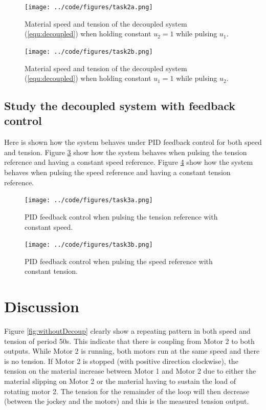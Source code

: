 \documentclass[a4paper, titlepage]{article}
\begin{document}
\begin{figure}[H]
\center
\texttt{[image: ../code/figures/task2a.png]}
\caption{Material speed and tension of the decoupled system (\ref{equ:decoupled}) when holding constant $u_2 = 1$ while pulsing $u_1$.}
\label{fig:withDecoupSpeedA}
\end{figure}

\begin{figure}[H]
\center
\texttt{[image: ../code/figures/task2b.png]}
\caption{Material speed and tension of the decoupled system (\ref{equ:decoupled}) when holding constant $u_1 = 1$ while pulsing $u_2$.}
\label{fig:withDecoupSpeedB}
\end{figure}


\subsection{Study the decoupled system with feedback control}
Here is shown how the system behaves under PID feedback control for both speed and tension.
Figure \ref{fig:withFeedbackDecoupSpeedA} show how the system behaves when pulsing the tension reference and having a constant speed reference.
Figure \ref{fig:withFeedbackDecoupSpeedB} show how the system behaves when pulsing the speed reference and having a constant tension reference.

\begin{figure}[H]
\center
\texttt{[image: ../code/figures/task3a.png]}
\caption{PID feedback control when pulsing the tension reference with constant speed.}
\label{fig:withFeedbackDecoupSpeedA}
\end{figure}

\begin{figure}[H]
\center
\texttt{[image: ../code/figures/task3b.png]}
\caption{PID feedback control when pulsing the speed reference with constant tension.}
\label{fig:withFeedbackDecoupSpeedB}
\end{figure}


\section{Discussion}
Figure \ref{fig:withoutDecoup} clearly show a repeating pattern in both speed and tension of period 50s.
This indicate that there is coupling from Motor 2 to both outputs.
While Motor 2 is running, both motors run at the same speed and there is no tension.
If Motor 2 is stopped (with positive direction clockwise), the tension on the material increase between Motor 1 and Motor 2 due to either the material slipping on Motor 2 or the material having to sustain the load of rotating motor 2.
The tension for the remainder of the loop will then decrease (between the jockey and the motors) and this is the measured tension output.
\end{document}
